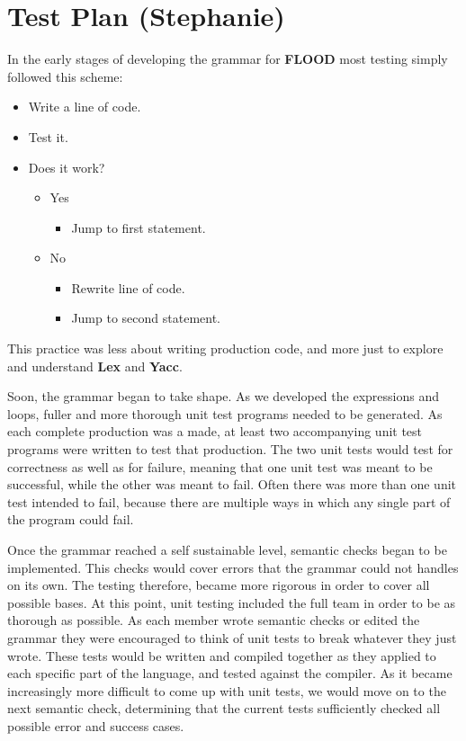 \documentclass[12pt]{report}
\begin{document}
\chapter{Test Plan (Stephanie)}

In the early stages of developing the grammar for \textbf{FLOOD} most testing simply followed this scheme:

\begin{itemize}
\item Write a line of code.
\item Test it.
\item Does it work?
\begin{itemize}
\item Yes
\begin{itemize}
\item Jump to first statement.
\end{itemize}
\item No
\begin{itemize}
\item Rewrite line of code.
\item Jump to second statement.
\end{itemize}
\end{itemize}
\end{itemize}

This practice was less about writing production code, and more just to explore and understand \textbf{Lex} and \textbf{Yacc}.

Soon, the grammar began to take shape. As we developed the expressions and loops, fuller and more thorough unit test programs needed to be generated. As each complete production was a made, at least two accompanying unit test programs were written to test that production. The two unit tests would test for correctness as well as for failure, meaning that one unit test was meant to be successful, while the other was meant to fail. Often there was more than one unit test intended to fail, because there are multiple ways in which any single part of the program could fail.

Once the grammar reached a self sustainable level, semantic checks began to be implemented. This checks would cover errors that the grammar could not handles on its own. The testing therefore, became more rigorous in order to cover all possible bases. At this point, unit testing included the full team in order to be as thorough as possible. As each member wrote semantic checks or edited the grammar they were encouraged to think of unit tests to break whatever they just wrote. These tests would be written and compiled together as they applied to each specific part of the language, and tested against the compiler. As it became increasingly more difficult to come up with unit tests, we would move on to the next semantic check, determining that the current tests sufficiently checked all possible error and success cases.
\end{document}
